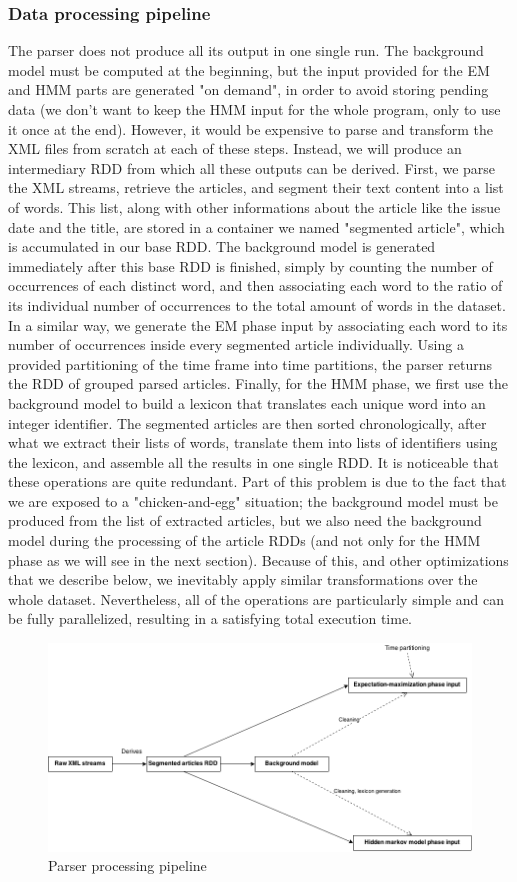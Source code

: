 \subsubsection{Data processing pipeline}
The parser does not produce all its output in one single run. The background model must be computed at the beginning, but the input provided for the EM and HMM parts are generated "on demand", in order to avoid storing pending data (we don't want to keep the HMM input for the whole program, only to use it once at the end). However, it would be expensive to parse and transform the XML files from scratch at each of these steps. Instead, we will produce an intermediary RDD from which all these outputs can be derived. First, we parse the XML streams, retrieve the articles, and segment their text content into a list of words. This list, along with other informations about the article like the issue date and the title, are stored in a container we named "segmented article", which is accumulated in our base RDD.
The background model is generated immediately after this base RDD is finished, simply by counting the number of occurrences of each distinct word, and then associating each word to the ratio of its individual number of occurrences to the total amount of words in the dataset.
In a similar way, we generate the EM phase input by associating each word to its number of occurrences inside every segmented article individually. Using a provided partitioning of the time frame into time partitions, the parser returns the RDD of grouped parsed articles.
Finally, for the HMM phase, we first use the background model to build a lexicon that translates each unique word into an integer identifier. The segmented articles are then sorted chronologically, after what we extract their lists of words, translate them into lists of identifiers using the lexicon, and assemble all the results in one single RDD.
It is noticeable that these operations are quite redundant. Part of this problem is due to the fact that we are exposed to a "chicken-and-egg" situation; the background model must be produced from the list of extracted articles, but we also need the background model during the processing of the article RDDs (and not only for the HMM phase as we will see in the next section). Because of this, and other optimizations that we describe below, we inevitably apply similar transformations over the whole dataset. Nevertheless, all of the operations are particularly simple and can be fully parallelized, resulting in a satisfying total execution time.

\begin{figure}[b]
   \caption{\label{parser_processing_steps} Parser processing pipeline}
   \includegraphics{parser_processing_steps.png}
\end{figure}